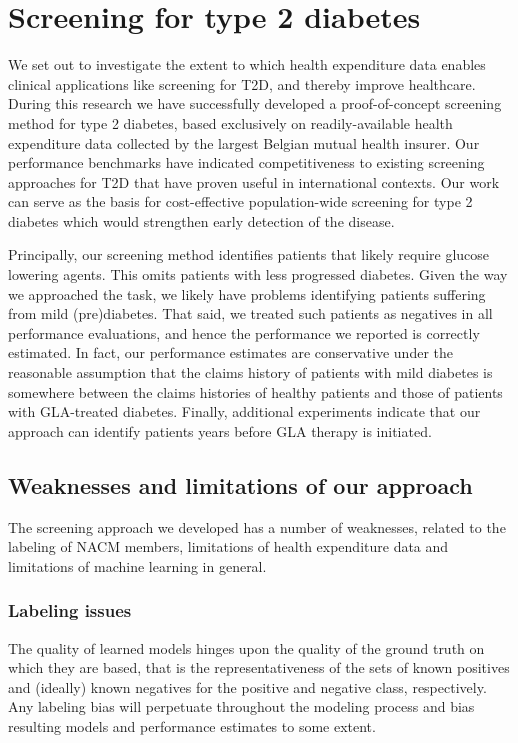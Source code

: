 \section{Screening for type 2 diabetes} \label{conclusion:screening}
We set out to investigate the extent to which health expenditure data enables clinical applications like screening for T2D, and thereby improve healthcare. During this research we have successfully developed a proof-of-concept screening method for type 2 diabetes, based exclusively on readily-available health expenditure data collected by the largest Belgian mutual health insurer. Our performance benchmarks have indicated competitiveness to existing screening approaches for T2D that have proven useful in international contexts. Our work can serve as the basis for cost-effective population-wide screening for type 2 diabetes which would strengthen early detection of the disease.

Principally, our screening method identifies patients that likely require glucose lowering agents. This omits patients with less progressed diabetes. Given the way we approached the task, we likely have problems identifying patients suffering from mild (pre)diabetes. That said, we treated such patients as negatives in all performance evaluations, and hence the performance we reported is correctly estimated. In fact, our performance estimates are conservative under the reasonable assumption that the claims history of patients with mild diabetes is somewhere between the claims histories of healthy patients and those of patients with GLA-treated diabetes. Finally, additional experiments indicate that our approach can identify patients years before GLA therapy is initiated.

\subsection{Weaknesses and limitations of our approach}
The screening approach we developed has a number of weaknesses, related to the labeling of NACM members, limitations of health expenditure data and limitations of machine learning in general.%

\subsubsection{Labeling issues}
The quality of learned models hinges upon the quality of the ground truth on which they are based, that is the representativeness of the sets of known positives and (ideally) known negatives for the positive and negative class, respectively. Any labeling bias will perpetuate throughout the modeling process and bias resulting models and performance estimates to some extent.

